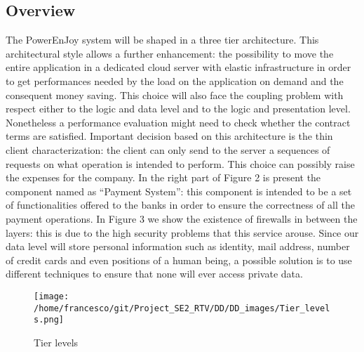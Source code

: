 \documentclass[10pt, a4paper,titlepage]{article}
\begin{document}
\subsection{Overview}
The PowerEnJoy system will be shaped in a three tier architecture. This architectural style allows a further enhancement: the possibility to move the entire application in a dedicated cloud server with elastic infrastructure in order to get performances needed by the load on the application on demand and the consequent money saving. This choice will also face the coupling problem with respect either to the logic and data level and to the logic and presentation level. Nonetheless a performance evaluation might need to check whether the contract terms are satisfied. Important decision based on this architecture is the thin client characterization: the client can only send to the server a sequences of requests on what operation is intended to perform. This choice can possibly raise the expenses for the company. In the right part of Figure 2 is present the component named as “Payment System”: this component is intended to be a set of functionalities offered to the banks in order to ensure the correctness of all the payment operations. In Figure 3 we show the existence of firewalls in between the layers: this is due to the high security problems that this service arouse. Since our data level will store personal information such as identity, mail address, number of credit cards and even positions of a human being, a possible solution is to use different techniques to ensure that none will ever access private data.
\begin{figure}
\begin{center}
\texttt{[image: /home/francesco/git/Project\_SE2\_RTV/DD/DD\_images/Tier\_levels.png]}
\end{center}
\caption{Tier levels}
\label{fig:tier_levels}
\end{figure}
\newpage
\end{document}
